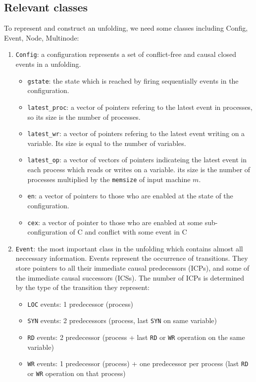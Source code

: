 \documentclass{llncs}
\begin{document}
\subsection{Relevant classes}
To represent and construct an unfolding, we need some classes including Config, Event, Node, Multinode:
\begin{enumerate}
\item
	\verb!Config!: a configuration represents a set of conflict-free and causal closed events in a unfolding.
	\begin{itemize}
	\item
		\verb!gstate!: the state which is reached by firing sequentially events in the configuration.
	\item
		\verb!latest_proc!: a vector of pointers refering to the latest event in processes, so its size is the number of
		 processes.
	\item
		\verb!latest_wr!: a vector of pointers refering to the latest event writing on a variable. Its size is equal to the
		 number of variables.
	\item
		\verb!latest_op!: a vector of vectors of pointers indicateing the latest event in each process which reads or writes on
		a variable. its size is the number of processes multiplied by the \verb!memsize! of input machine $m$.
	\item
		\verb!en!: a vector of pointers to those who are enabled at the state of the configuration.
	\item
		\verb!cex!: a vector of pointer to those who are enabled at some sub-configuration of C and conflict with some event in
		 C
	\end{itemize}
\item
	\verb!Event!: the most important class in the unfolding which contains almost all neccessary information. Events represent the occurrence of transitions.
They store pointers to all their immediate causal predecessors (ICPs), and some of
the immediate causal successors (ICSs).
The number of ICPs is determined by the type of the transition they
represent:

\begin{itemize}
\item \verb!LOC! events: 1 predecessor (process)
\item \verb!SYN! events: 2 predecessors (process, last \verb!SYN! on same variable)
\item \verb!RD!  events: 2 predecessor (process + last \verb!RD! or
	\verb!WR! operation on the same variable)
\item \verb!WR!  events: 1 predecessor (process) + one predecessor per
	process (last \verb!RD! or \verb!WR! operation on that process)
\end{itemize}


\end{enumerate}
\end{document}
